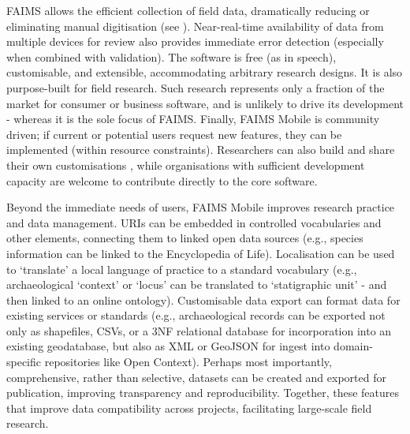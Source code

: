\documentclass[preprint,12pt, a4paper]{elsarticle}
\begin{document}
FAIMS allows the efficient collection of field data, dramatically reducing or eliminating manual digitisation (see \cite{Sobotkova2016-mx}). Near-real-time availability of data from multiple devices for review also provides immediate error detection (especially when combined with validation). The software is free (as in speech), customisable, and extensible, accommodating arbitrary research designs. It is also purpose-built for field research. Such research represents only a fraction of the market for consumer or business software, and is unlikely to drive its development - whereas it is the sole focus of FAIMS. Finally, FAIMS Mobile is community driven; if current or potential users request new features, they can be implemented (within resource constraints). Researchers can also build and share their own customisations \cite{Sobotkova2016-mx}, while organisations with sufficient development capacity are welcome to contribute directly to the core software.

Beyond the immediate needs of users, FAIMS Mobile improves research practice and data management. URIs can be embedded in controlled vocabularies and other elements\cite{Sobotkova2015-lq}, connecting them to linked open data sources (e.g., species information can be linked to the Encyclopedia of Life\cite{Wilson2003-xx}). Localisation can be used to `translate' a local language of practice to a standard vocabulary (e.g., archaeological `context' or `locus' can be translated to `statigraphic unit' - and then linked to an online ontology). Customisable data export can format data for existing services or standards (e.g., archaeological records can be exported not only as shapefiles, CSVs, or a 3NF relational database for incorporation into an existing geodatabase, but also as XML or GeoJSON for ingest into domain-specific repositories like Open Context). Perhaps most importantly, comprehensive, rather than selective, datasets can be created and exported for publication, improving transparency and reproducibility. Together, these features that improve data compatibility across projects, facilitating large-scale field research. 
\end{document}
